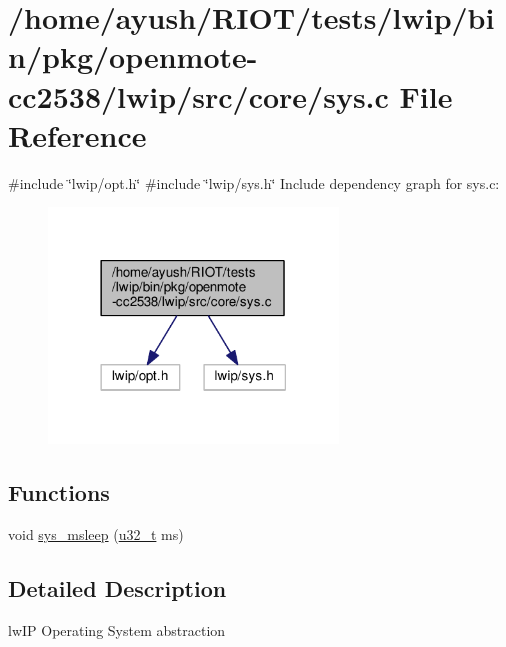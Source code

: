 \hypertarget{openmote-cc2538_2lwip_2src_2core_2sys_8c}{}\section{/home/ayush/\+R\+I\+O\+T/tests/lwip/bin/pkg/openmote-\/cc2538/lwip/src/core/sys.c File Reference}
\label{openmote-cc2538_2lwip_2src_2core_2sys_8c}
{\ttfamily \#include \char`\"{}lwip/opt.\+h\char`\"{}}\newline
{\ttfamily \#include \char`\"{}lwip/sys.\+h\char`\"{}}\newline
Include dependency graph for sys.\+c\+:
\nopagebreak
\begin{figure}[H]
\begin{center}
\leavevmode
\includegraphics[width=218pt]{openmote-cc2538_2lwip_2src_2core_2sys_8c__incl}
\end{center}
\end{figure}
\subsection*{Functions}
\begin{DoxyCompactItemize}
\item 
void \hyperlink{group__sys__misc_ga6b8786f43e779953e8b74e983c88682e}{sys\+\_\+msleep} (\hyperlink{group__compiler__abstraction_ga4c14294869aceba3ef9d4c0c302d0f33}{u32\+\_\+t} ms)
\end{DoxyCompactItemize}


\subsection{Detailed Description}
lw\+IP Operating System abstraction 